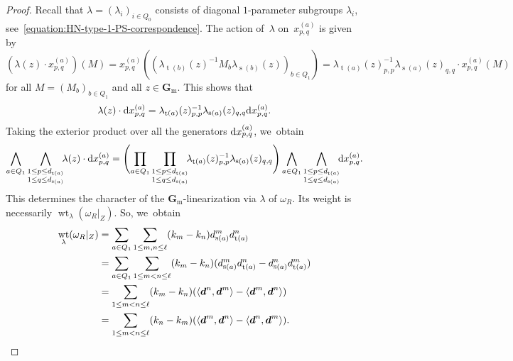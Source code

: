 \documentclass[JEP,XML,SOM,Unicode,NoEqCountersInSection,published]{cedram}
\theoremstyle{plain}
\theoremstyle{definition}
\DeclareMathOperator\source{s}
\DeclareMathOperator\target{t}
\DeclareMathOperator\weight{wt}
\newcommand\diff{\mathrm{d} \kern 0pt}
\newcommand\Gm{\ensuremath{\mathbf{G}_{\mathrm{m}}}}
\newcommand\tuple[1]{\ensuremath{{\boldsymbol{#1}}}}
\begin{document}
\begin{proof}
Recall that $\lambda = (\lambda_i)_{i \in Q_0}$ consists of diagonal $1$-parameter subgroups $\lambda_i$,
see~\eqref{equation:HN-type-1-PS-correspondence}.
The action of~$\lambda$ on~$x_{p,q}^{(a)}$ is given by
\begin{equation*}
(\lambda(z) \cdot x_{p,q}^{(a)})(M) = x_{p,q}^{(a)}((\lambda_{\target(b)}(z)^{-1}M_b\lambda_{\source(b)}(z))_{b \in Q_1})
= \lambda_{\target(a)}(z)_{p,p}^{-1}\lambda_{\source(a)}(z)_{q,q}\cdot x_{p,q}^{(a)}(M)
\end{equation*}
for all $M = (M_b)_{b \in Q_1}$ and all $z \in \Gm$.
This shows that
\begin{equation*}
\lambda(z)\cdot \diff x_{p,q}^{(a)} = \lambda_{\target(a)}(z)_{p,p}^{-1}\lambda_{\source(a)}(z)_{q,q} \diff x_{p,q}^{(a)}.
\end{equation*}
Taking the exterior product over all the generators $\diff x_{p,q}^{(a)}$, we~obtain
\begin{equation*}
\bigwedge_{a \in Q_1}\bigwedge_{\substack{1 \leq p \leq d_{\target(a)} \\ 1 \leq q \leq d_{\source(a)}}} \!\! \lambda(z)\cdot \diff x_{p,q}^{(a)}
= \Biggl( \prod_{a \in Q_1} \prod_{\substack{1 \leq p \leq d_{\target(a)} \\ 1 \leq q \leq d_{\source(a)}}} \!\! \lambda_{\target(a)}(z)_{p,p}^{-1}\lambda_{\source(a)}(z)_{q,q} \Biggr) \bigwedge_{a \in Q_1} \bigwedge_{\substack{1 \leq p \leq d_{\target(a)} \\ 1 \leq q \leq d_{\source(a)}}} \!\!\diff x_{p,q}^{(a)}.
\end{equation*}
This determines the character of the $\Gm$-linearization via $\lambda$ of $\omega_R$.
Its weight is necessarily $\weight_\lambda(\omega_R|_Z)$. So, we~obtain
\begin{align*}
\weight_\lambda(\omega_R|_Z)
&= \sum_{a \in Q_1} \sum_{1 \leq m,n \leq \ell} (k_m - k_n) d_{\source(a)}^m d_{\target(a)}^n \\
&= \sum_{a \in Q_1} \sum_{1 \leq m < n \leq \ell}(k_m - k_n)(d_{\source(a)}^m d_{\target(a)}^n - d_{\source(a)}^n d_{\target(a)}^m) \\
&= \sum_{1 \leq m < n \leq \ell}(k_m - k_n)(\langle \tuple{d}^n,\tuple{d}^m \rangle - \langle \tuple{d}^m,\tuple{d}^n \rangle) \\
&= \sum_{1 \leq m < n \leq \ell}(k_n - k_m)(\langle \tuple{d}^m,\tuple{d}^n \rangle - \langle \tuple{d}^n,\tuple{d}^m \rangle).\qedhere
\end{align*}
\end{proof}
\end{document}
